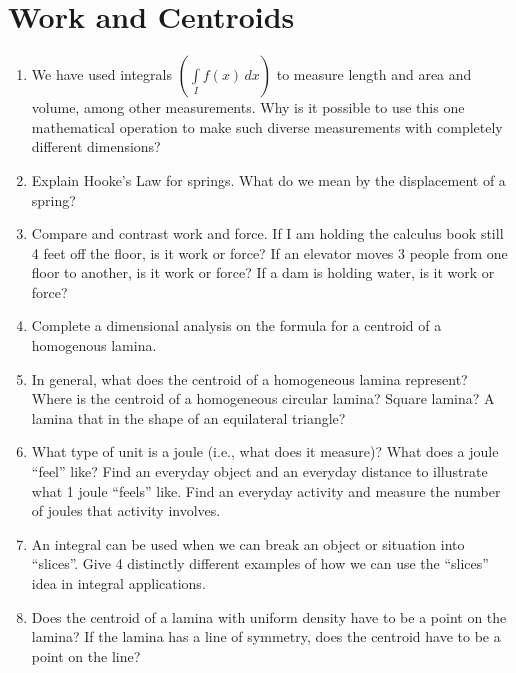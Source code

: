 \section{Work and Centroids}\begin{enumerate}

\item  We have used integrals $\left( {\int\limits_I {f(x)\,dx} } \right)$ to measure length and area and volume, among other measurements.  Why is it possible to use this one mathematical operation to make such diverse measurements with completely different dimensions?

\item  Explain Hooke's Law for springs.  What do we mean by the displacement of a spring?  

\item  Compare and contrast work and force.  If I am holding the calculus book still 4 feet off the floor, is it work or force?  If an elevator moves 3 people from one floor to another, is it work or force?  If a dam is holding water, is it work or force?  

\item  Complete a dimensional analysis on the formula for a centroid of a homogenous lamina.

\item  In general, what does the centroid of a homogeneous lamina represent?  Where is the centroid of a homogeneous circular lamina?  Square lamina?  A lamina that in the shape of an equilateral triangle? 

\item  What type of unit is a joule (i.e., what does it measure)?  What does a joule ``feel'' like?  Find an everyday object and an everyday distance to illustrate what 1 joule ``feels'' like.  Find an everyday activity and measure the number of joules that activity involves.

\item  An integral can be used when we can break an object or situation into ``slices''.  Give 4 distinctly different examples of how we can use the ``slices'' idea in integral applications.

\item  Does the centroid of a lamina with uniform density have to be a point on the lamina?  If the lamina has a line of symmetry, does the centroid have to be a point on the line?

\end{enumerate}
